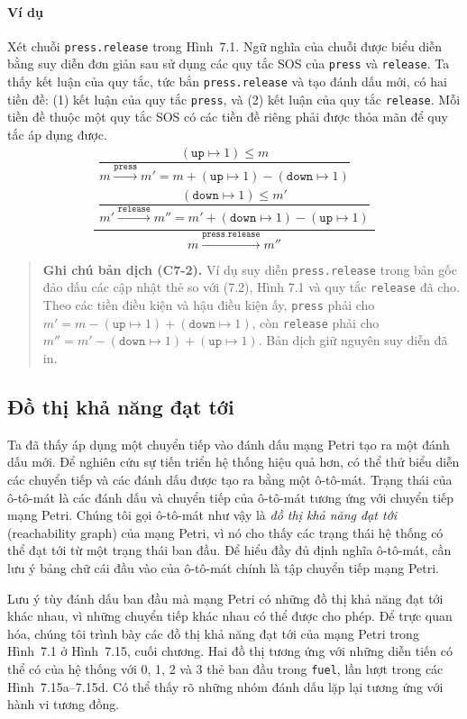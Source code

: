 \paragraph{Ví dụ}
Xét chuỗi \texttt{press.release} trong Hình~7.1. Ngữ nghĩa của chuỗi được biểu diễn bằng suy diễn đơn giản sau sử dụng các quy tắc SOS của \texttt{press} và \texttt{release}. Ta thấy kết luận của quy tắc, tức bắn \texttt{press.release} và tạo đánh dấu mới, có hai tiền đề: (1) kết luận của quy tắc \texttt{press}, và (2) kết luận của quy tắc \texttt{release}. Mỗi tiền đề thuộc một quy tắc SOS có các tiền đề riêng phải được thỏa mãn để quy tắc áp dụng được.
\[
\frac{
\begin{gathered}
\dfrac{(\texttt{up}\mapsto1)\leqslant m}{m\xrightarrow{\texttt{press}}m'=m+(\texttt{up}\mapsto1)-(\texttt{down}\mapsto1)}
\\[1ex]
\dfrac{(\texttt{down}\mapsto1)\leqslant m'}{m'\xrightarrow{\texttt{release}}m''=m'+(\texttt{down}\mapsto1)-(\texttt{up}\mapsto1)}
\end{gathered}
}{m\xrightarrow{\texttt{press.release}}m''}
\]
\begin{quote}
\small\textbf{Ghi chú bản dịch (C7-2).} Ví dụ suy diễn \texttt{press.release} trong bản gốc đảo dấu các cập nhật thẻ so với (7.2), Hình 7.1 và quy tắc \texttt{release} đã cho. Theo các tiền điều kiện và hậu điều kiện ấy, \texttt{press} phải cho $m'=m-(\texttt{up}\mapsto1)+(\texttt{down}\mapsto1)$, còn \texttt{release} phải cho $m''=m'-(\texttt{down}\mapsto1)+(\texttt{up}\mapsto1)$. Bản dịch giữ nguyên suy diễn đã in.
\end{quote}


\subsection{Đồ thị khả năng đạt tới}
Ta đã thấy áp dụng một chuyển tiếp vào đánh dấu mạng Petri tạo ra một đánh dấu mới. Để nghiên cứu sự tiến triển hệ thống hiệu quả hơn, có thể thử biểu diễn các chuyển tiếp và các đánh dấu được tạo ra bằng một ô-tô-mát. Trạng thái của ô-tô-mát là các đánh dấu và chuyển tiếp của ô-tô-mát tương ứng với chuyển tiếp mạng Petri. Chúng tôi gọi ô-tô-mát như vậy là \emph{đồ thị khả năng đạt tới} (reachability graph) của mạng Petri, vì nó cho thấy các trạng thái hệ thống có thể đạt tới từ một trạng thái ban đầu. Để hiểu đầy đủ định nghĩa ô-tô-mát, cần lưu ý bảng chữ cái đầu vào của ô-tô-mát chính là tập chuyển tiếp mạng Petri.

Lưu ý tùy đánh dấu ban đầu mà mạng Petri có những đồ thị khả năng đạt tới khác nhau, vì những chuyển tiếp khác nhau có thể được cho phép. Để trực quan hóa, chúng tôi trình bày các đồ thị khả năng đạt tới của mạng Petri trong Hình~7.1 ở Hình~7.15, cuối chương. Hai đồ thị tương ứng với những diễn tiến có thể có của hệ thống với 0, 1, 2 và 3 thẻ ban đầu trong \texttt{fuel}, lần lượt trong các Hình~7.15a--7.15d. Có thể thấy rõ những nhóm đánh dấu lặp lại tương ứng với hành vi tương đồng.

